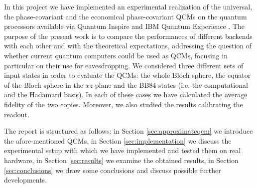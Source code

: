 In this project we have implemented an experimental realization of the universal, the phase-covariant and the economical phase-covariant QCMs on the quantum processors available via Quantum Inspire \cite{quantuminspire} and IBM Quantum Experience \cite{ibmquantumexperience}.
The purpose of the present work is to compare the performances of different backends with each other and with the theoretical expectations,
addressing the question of whether current quantum computers could be used as QCMs, focusing in particular on their use for eavesdropping.
We considered three different sets of input states in order to evaluate the QCMs: the whole Bloch sphere, the equator of the Bloch sphere in the $xz$-plane and the BB84 states (i.e. the computational and the Hadamard basis).
In each of these cases we have calculated the average fidelity of the two copies.
Moreover, we also studied the results calibrating the readout.

The report is structured as follows: 
in Section \ref{sec:approximateqcm} we introduce the afore-mentioned QCMs, 
in Section \ref{sec:implementation} we discuss the experimental setup with which we have implemented and tested them on real hardware,
in Section \ref{sec:results} we examine the obtained results,
in Section \ref{sec:conclusions} we draw some conclusions and discuss possible further developments.
